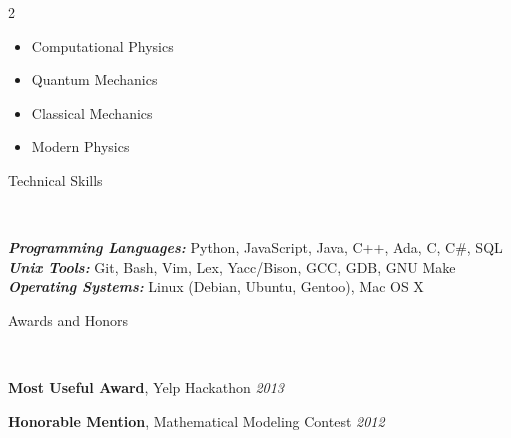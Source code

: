 \documentclass[9pt]{article}
\newenvironment{changemargin}[2]{%
  \begin{list}{}{%
    \setlength{\topsep}{0pt}%
    \setlength{\leftmargin}{#1}%
    \setlength{\rightmargin}{#2}%
    \setlength{\listparindent}{\parindent}%
    \setlength{\itemindent}{\parindent}%
    \setlength{\parsep}{\parskip}%
  }%
  \item[]}{\end{list}
}
\newcommand{\lineover}{
    \begin{changemargin}{-0.05in}{-0.05in}
        \vspace*{-8pt}
        \hrulefill \\
        \vspace*{-2pt}
    \end{changemargin}
}
\newcommand{\header}[1]{
    \begin{changemargin}{-0.5in}{-0.5in}
        {\large #1}\\
        \lineover
    \end{changemargin}
}
\newenvironment{body} {
    \vspace*{-16pt}
    \begin{changemargin}{-0.20in}{-0.5in}
  }
    {\end{changemargin}
}
\begin{document}
\begin{body}
\begin{multicols}{2}
\begin{itemize}
            \item [] Computational Physics
            \item [] Quantum Mechanics
            \item [] Classical Mechanics
            \item [] Modern Physics


        \end{itemize}
    \end{multicols}
\end{body}



\header{Technical Skills}
\begin{body}
    \vspace{14pt}
    \emph{\textbf{Programming Languages:}}{} Python, JavaScript, Java, C++, Ada, C, C\#, SQL\\
    \medskip
    \emph{\textbf{Unix Tools:}}{} Git, Bash, Vim, Lex, Yacc/Bison, GCC, GDB, GNU Make\\
    \medskip
    \emph{\textbf{Operating Systems:}}{} Linux (Debian, Ubuntu, Gentoo), Mac OS X\\
\end{body}

\smallskip



\header{Awards and Honors}

\begin{body}
    \vspace{14pt}

    \textbf{Most Useful Award}, Yelp Hackathon \hfill{} \emph{2013}\\
    \smallskip

    \textbf{Honorable Mention}, Mathematical Modeling Contest \hfill{} \emph{2012}\\

\end{body}
\smallskip
\end{document}
